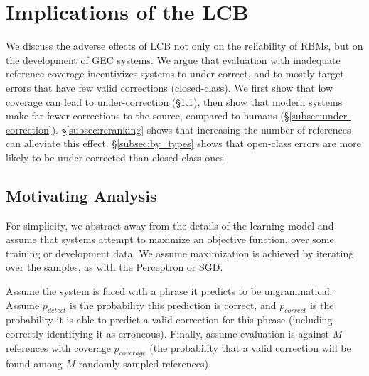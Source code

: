 \documentclass[a4paper]{article}
\newcommand{\lc}[1]{\footnote{\color{blue}LC: #1}}
\begin{document}


\section{Implications of the LCB}\label{sec:formal_conservatism}

We discuss the adverse effects of LCB not only on the reliability of RBMs, but on the development
of GEC systems.
We argue that evaluation with inadequate reference coverage incentivizes systems to under-correct,
and to mostly target errors that have few valid corrections (closed-class).
We first show that low coverage can lead to under-correction (\S\ref{subsec:motivating_analysis}),
then show that modern systems make far fewer corrections to the source, compared to humans (\S\ref{subsec:under-correction}).
\S\ref{subsec:reranking} shows that increasing the number of references can alleviate this effect.
\S\ref{subsec:by_types} shows that open-class errors are more likely to be under-corrected than closed-class ones.

\subsection{Motivating Analysis}\label{subsec:motivating_analysis}

For simplicity, we abstract away from the details of the learning model and assume 
that systems attempt to maximize an objective function, 
over some training or development data. 
We assume maximization is achieved by iterating over the samples, as with the Perceptron or SGD.

Assume the system is faced with a phrase it predicts to be ungrammatical. 
Assume $p_{detect}$ is the probability this prediction is correct, and
$p_{correct}$ is the probability it is able to predict
a valid correction for this phrase (including correctly identifying it as erroneous).
Finally, assume evaluation is
against $M$ references with coverage $p_{coverage}$
(the probability that
a valid correction will be found among $M$ randomly sampled references).
\end{document}
